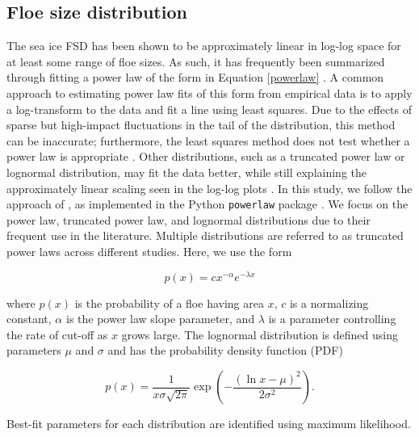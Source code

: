\documentclass[review, jog]{igs}
\begin{document}
\subsection{Floe size distribution}
The sea ice FSD has been shown to be approximately linear in log-log space for at least some range of floe sizes. 
As such, it has frequently been summarized through fitting a power law of the form in Equation \ref{powerlaw} \citep{rothrock1984_MeasuringSea, stern2018_ReconcilingDisparate}.
A common approach to estimating power law fits of this form from empirical data is to apply a log-transform to the data and fit a line using least squares.
Due to the effects of sparse but high-impact fluctuations in the tail of the distribution, this method can be inaccurate; furthermore, the least squares method does not test whether a power law is appropriate \citep{clauset2009_PowerLawDistributions, bauke2007_ParameterEstimation, goldstein2004_ProblemsFitting}.
Other distributions, such as a truncated power law or lognormal distribution, may fit the data better, while still explaining the approximately linear scaling seen in the log-log plots \citep[e.g.,][]{toyota2006_CharacteristicsSea, herman2010_SeaiceFloesize, burroughs2001_UppertruncatedPower,montiel2022_TheoreticalFrameworka, lu2008_AerialObservations}.
In this study, we follow the approach of \cite{clauset2009_PowerLawDistributions}, as implemented in the Python \texttt{powerlaw} package \citep{alstott2014_PowerlawPython}.
We focus on the power law, truncated power law, and lognormal distributions due to their frequent use in the literature. Multiple distributions are referred to as truncated power laws across different studies. Here, we use the form
\begin{linenomath*}
\begin{equation}
    p(x) = cx^{-\alpha}e^{-\lambda x} \label{truncpowerlaw}
\end{equation}
\end{linenomath*}
where $p(x)$ is the probability of a floe having area $x$, $c$ is a normalizing constant, $\alpha$ is the power law slope parameter, and $\lambda$ is a parameter controlling the rate of cut-off as $x$ grows large. The lognormal distribution is defined using parameters $\mu$ and $\sigma$ and has the probability density function (PDF)
\begin{linenomath*}
    \begin{equation}
        p(x) = \frac{1}{x\sigma\sqrt{2\pi}}\exp\left(-\frac{(\ln x - \mu)^2}{2\sigma^2}\right).
    \end{equation}
\end{linenomath*}
Best-fit parameters for each distribution are identified using maximum likelihood.
\end{document}
